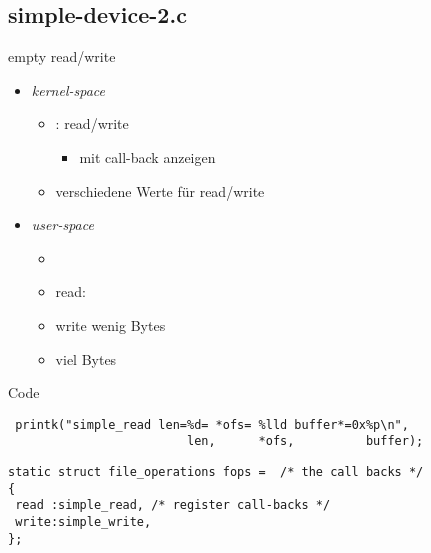 \subsection{simple-device-2.c}
\begin{frame}{}{empty read/write}
 \begin{itemize}
  \item {\em kernel-space}
  \begin{itemize}
  \item {}: read/write
  \begin{itemize}
   \item mit  call-back anzeigen
  \end{itemize}
  \item verschiedene  Werte für read/write
  \end{itemize}
  \item {\em user-space}
  \begin{itemize}
  \item {} 
  \item read: 
  \item write wenig Bytes  
  \item viel Bytes 
  \end{itemize}
 \end{itemize}
\end{frame}

\begin{frame}[fragile]{Code}
 \begin{lstlisting}
 printk("simple_read len=%d= *ofs= %lld buffer*=0x%p\n",
                         len,      *ofs,          buffer);
 \end{lstlisting}
\begin{lstlisting}
static struct file_operations fops =  /* the call backs */
{
 read :simple_read, /* register call-backs */
 write:simple_write,
};
\end{lstlisting}
\end{frame}
